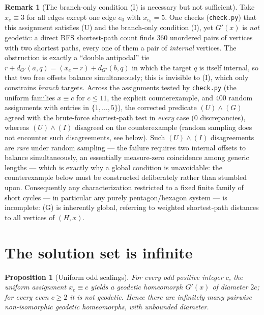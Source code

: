 \documentclass{amsart}
\newtheorem{proposition}{Proposition}
\theoremstyle{definition}
\newtheorem{remark}{Remark}
\begin{document}
\begin{remark}[The branch-only condition (I) is necessary but not
sufficient]\label{rem:counterex}
Take $x_e\equiv3$ for all edges except one edge $e_0$ with $x_{e_0}=5$. One
checks (\texttt{check.py}) that this assignment satisfies (U) and the branch-only
condition (I), yet $G'(x)$ is \emph{not} geodetic: a direct BFS shortest-path
count finds $360$ unordered pairs of vertices with two shortest paths, every one
of them a pair of \emph{internal} vertices. The obstruction is exactly a
``double antipodal'' tie
$r+d_{G'}(a,q)=(x_e-r)+d_{G'}(b,q)$ in which the target $q$ is itself internal,
so that two free offsets balance simultaneously; this is invisible to (I), which
only constrains \emph{branch} targets. Across the assignments tested by
\texttt{check.py} (the uniform families $x\equiv c$ for $c\le 11$, the explicit
counterexample, and $400$ random assignments with entries in $\{1,\dots,5\}$),
the corrected predicate $(U)\wedge(G)$ agreed with the brute-force shortest-path
test in \emph{every} case ($0$ discrepancies), whereas $(U)\wedge(I)$ disagreed
on the counterexample (random sampling does not encounter such disagreements,
see below). Such $(U)\wedge(I)$ disagreements are
\emph{rare} under random sampling --- the failure requires two internal offsets
to balance simultaneously, an essentially measure-zero coincidence among generic
lengths --- which is exactly why a global condition is unavoidable: the
counterexample below must be constructed deliberately rather than stumbled upon.
Consequently any characterization restricted to a fixed finite
family of short cycles --- in particular any purely pentagon/hexagon system ---
is incomplete: (G) is inherently global, referring to weighted shortest-path
distances to all vertices of $(H,x)$.
\end{remark}

\section{The solution set is infinite}

\begin{proposition}[Uniform odd scalings]\label{prop:infinite}
For every odd positive integer $c$, the uniform assignment $x_e\equiv c$ yields a
geodetic homeomorph $G'(x)$ of diameter $2c$; for every even $c\ge2$ it is not
geodetic. Hence there are infinitely many pairwise non-isomorphic geodetic
homeomorphs, with unbounded diameter.
\end{proposition}
\end{document}
